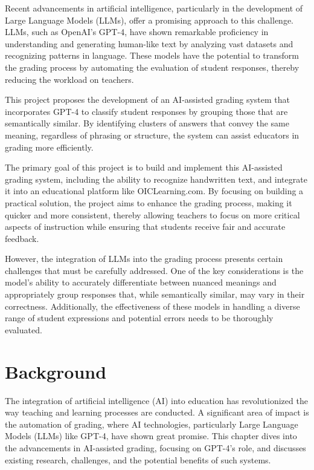 \documentclass[ms,twoside,print]{nuthesis}
\begin{document}
Recent advancements in artificial intelligence, particularly in the development of Large Language Models (LLMs), offer a promising approach to this challenge. LLMs, such as OpenAI's GPT-4, have shown remarkable proficiency in understanding and generating human-like text by analyzing vast datasets and recognizing patterns in language. These models have the potential to transform the grading process by automating the evaluation of student responses, thereby reducing the workload on teachers.

This project proposes the development of an AI-assisted grading system that incorporates GPT-4 to classify student responses by grouping those that are semantically similar. By identifying clusters of answers that convey the same meaning, regardless of phrasing or structure, the system can assist educators in grading more efficiently.

The primary goal of this project is to build and implement this AI-assisted grading system, including the ability to recognize handwritten text, and integrate it into an educational platform like OICLearning.com. By focusing on building a practical solution, the project aims to enhance the grading process, making it quicker and more consistent, thereby allowing teachers to focus on more critical aspects of instruction while ensuring that students receive fair and accurate feedback.

However, the integration of LLMs into the grading process presents certain challenges that must be carefully addressed. One of the key considerations is the model's ability to accurately differentiate between nuanced meanings and appropriately group responses that, while semantically similar, may vary in their correctness. Additionally, the effectiveness of these models in handling a diverse range of student expressions and potential errors needs to be thoroughly evaluated.

\chapter{Background}

The integration of artificial intelligence (AI) into education has revolutionized the way teaching and learning processes are conducted. A significant area of impact is the automation of grading, where AI technologies, particularly Large Language Models (LLMs) like GPT-4, have shown great promise. This chapter dives into the advancements in AI-assisted grading, focusing on GPT-4's role, and discusses existing research, challenges, and the potential benefits of such systems.
\end{document}
